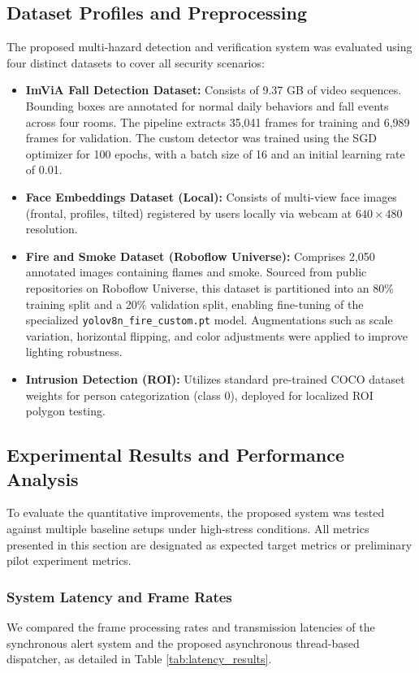 \documentclass[12pt,a4paper]{article}
\begin{document}
\subsection{Dataset Profiles and Preprocessing}
The proposed multi-hazard detection and verification system was evaluated using four distinct datasets to cover all security scenarios:
\begin{itemize}
    \item \textbf{ImViA Fall Detection Dataset:} Consists of 9.37 GB of video sequences. Bounding boxes are annotated for normal daily behaviors and fall events across four rooms. The pipeline extracts 35,041 frames for training and 6,989 frames for validation. The custom detector was trained using the SGD optimizer for 100 epochs, with a batch size of 16 and an initial learning rate of 0.01.
    \item \textbf{Face Embeddings Dataset (Local):} Consists of multi-view face images (frontal, profiles, tilted) registered by users locally via webcam at $640 \times 480$ resolution.
    \item \textbf{Fire and Smoke Dataset (Roboflow Universe):} Comprises 2,050 annotated images containing flames and smoke. Sourced from public repositories on Roboflow Universe, this dataset is partitioned into an 80\% training split and a 20\% validation split, enabling fine-tuning of the specialized \texttt{yolov8n\_fire\_custom.pt} model. Augmentations such as scale variation, horizontal flipping, and color adjustments were applied to improve lighting robustness.
    \item \textbf{Intrusion Detection (ROI):} Utilizes standard pre-trained COCO dataset weights for person categorization (class 0), deployed for localized ROI polygon testing.
\end{itemize}

\subsection{Experimental Results and Performance Analysis}
To evaluate the quantitative improvements, the proposed system was tested against multiple baseline setups under high-stress conditions. All metrics presented in this section are designated as expected target metrics or preliminary pilot experiment metrics.

\subsubsection{System Latency and Frame Rates}
We compared the frame processing rates and transmission latencies of the synchronous alert system and the proposed asynchronous thread-based dispatcher, as detailed in Table \ref{tab:latency_results}.
\end{document}
